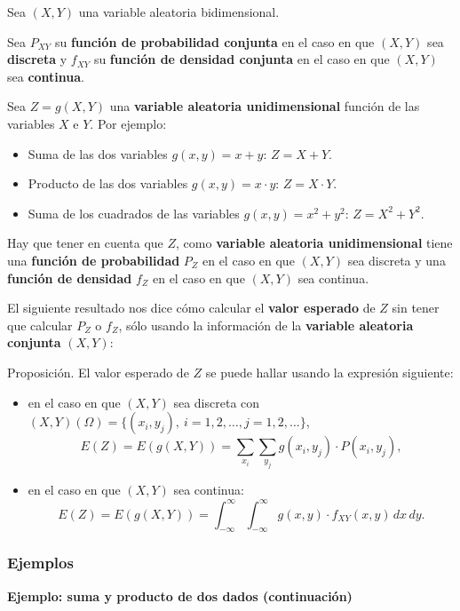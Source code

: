 \documentclass[]{book}
\providecommand{\tightlist}{%
  \setlength{\itemsep}{0pt}\setlength{\parskip}{0pt}}
\begin{document}
Sea \((X,Y)\) una variable aleatoria bidimensional.

Sea \(P_{XY}\) su \textbf{función de probabilidad conjunta} en el caso en que \((X,Y)\) sea \textbf{discreta} y \(f_{XY}\) su \textbf{función de densidad conjunta} en el caso en que \((X,Y)\) sea \textbf{continua}.

Sea \(Z=g(X,Y)\) una \textbf{variable aleatoria unidimensional} función de las variables \(X\) e \(Y\). Por ejemplo:

\begin{itemize}
\tightlist
\item
  Suma de las dos variables \(g(x,y)=x+y\): \(Z=X+Y\).
\item
  Producto de las dos variables \(g(x,y)=x\cdot y\): \(Z=X\cdot Y\).
\item
  Suma de los cuadrados de las variables \(g(x,y)=x^2+y^2\): \(Z=X^2+Y^2\).
\end{itemize}

Hay que tener en cuenta que \(Z\), como \textbf{variable aleatoria unidimensional} tiene una \textbf{función de probabilidad} \(P_Z\) en el caso en que \((X,Y)\) sea discreta y una \textbf{función de densidad} \(f_Z\) en el caso en que \((X,Y)\) sea continua.

El siguiente resultado nos dice cómo calcular el \textbf{valor esperado} de \(Z\) sin tener que calcular \(P_Z\) o \(f_Z\), sólo usando la información de la \textbf{variable aleatoria conjunta} \((X,Y)\):

Proposición.
El valor esperado de \(Z\) se puede hallar usando la expresión siguiente:

\begin{itemize}
\item
  en el caso en que \((X,Y)\) sea discreta con \((X,Y)(\Omega)=\{(x_i,y_j),\ i=1,2,\ldots, j=1,2,\ldots\}\),
  \[
  E(Z)  = E(g(X,Y))  =\sum_{x_i}\sum_{y_j}g(x_i,y_j)\cdot P(x_i,y_j),
  \]
\item
  en el caso en que \((X,Y)\) sea continua:
  \[
  E(Z)=E(g(X,Y))=\int_{-\infty}^\infty \int_{-\infty}^\infty g(x,y)\cdot f_{XY}(x,y)\, dx\, dy.
  \]
\end{itemize}

\hypertarget{ejemplos-3}{%
\subsubsection{Ejemplos}\label{ejemplos-3}}

\textbf{Ejemplo: suma y producto de dos dados (continuación)}
\end{document}
